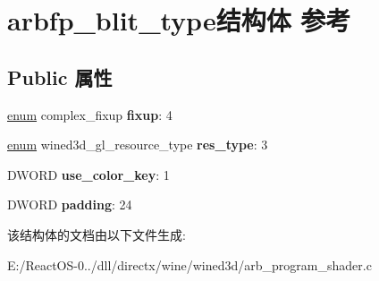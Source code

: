 \hypertarget{structarbfp__blit__type}{}\section{arbfp\+\_\+blit\+\_\+type结构体 参考}
\label{structarbfp__blit__type}
\subsection*{Public 属性}
\begin{DoxyCompactItemize}
\item 
\mbox{\label{structarbfp__blit__type_aaec0ea60a924024644f292b3555fe055}} 
\hyperlink{interfaceenum}{enum} complex\+\_\+fixup {\bfseries fixup}\+: 4
\item 
\mbox{\label{structarbfp__blit__type_a99e68a5c5a788cc1921a07e352422341}} 
\hyperlink{interfaceenum}{enum} wined3d\+\_\+gl\+\_\+resource\+\_\+type {\bfseries res\+\_\+type}\+: 3
\item 
\mbox{\label{structarbfp__blit__type_adc5260a80d28ad7c97d915ea624260ce}} 
D\+W\+O\+RD {\bfseries use\+\_\+color\+\_\+key}\+: 1
\item 
\mbox{\label{structarbfp__blit__type_a87bce607a92f82f3880b48cee59f2fa6}} 
D\+W\+O\+RD {\bfseries padding}\+: 24
\end{DoxyCompactItemize}


该结构体的文档由以下文件生成\+:\begin{DoxyCompactItemize}
\item 
E\+:/\+React\+O\+S-\/0../dll/directx/wine/wined3d/arb\+\_\+program\+\_\+shader.\+c\end{DoxyCompactItemize}
